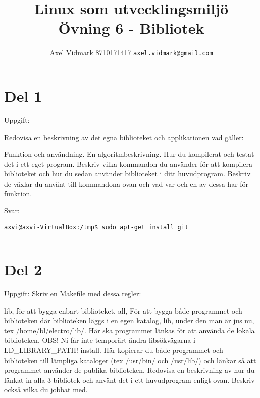 \documentclass[10pt, a4paper]{article}
\author{Axel Vidmark 8710171417 \href{mailto:axel.vidmark@gmail.com}{\texttt{axel.vidmark@gmail.com}}}
\title{Linux som utvecklingsmiljö \\ Övning 6 - Bibliotek}
\begin{document}
\maketitle


\section*{Del 1}\label{sec:del1}

Uppgift:
\begin{enumerate}
Redovisa en beskrivning av det egna biblioteket och applikationen vad gäller:

Funktion och användning.
En algoritmbeskrivning.
Hur du kompilerat och testat det i ett eget program. Beskriv vilka kommandon du använder för att kompilera biblioteket och hur du sedan använder biblioteket i ditt huvudprogram.
Beskriv de växlar du använt till kommandona ovan och vad var och en av dessa har för funktion.
\end{enumerate}

\vspace{10pt}
Svar:

\begin{verbatim}
axvi@axvi-VirtualBox:/tmp$ sudo apt-get install git


\end{verbatim}


\cleardoublepage

\section*{Del 2}\label{sec:del2}

Uppgift:
Skriv en Makefile med dessa regler:

lib, för att bygga enbart biblioteket.
all, För att bygga både programmet och biblioteken där biblioteken läggs i en egen katalog, lib,  under den man är jus nu, tex /home/bl/electro/lib/. Här ska programmet länkas för att använda de lokala biblioteken. OBS! Ni får inte temporärt ändra libsökvägarna i LD_LIBRARY_PATH!
install. Här kopierar du både programmet och biblioteken till lämpliga kataloger (tex /usr/bin/ och /usr/lib/) och länkar så att programmet använder de publika biblioteken.
Redovisa en beskrivning av hur du länkat in alla 3 bibliotek och använt det i ett huvudprogram enligt ovan. Beskriv också vilka du jobbat med.
\end{document}
